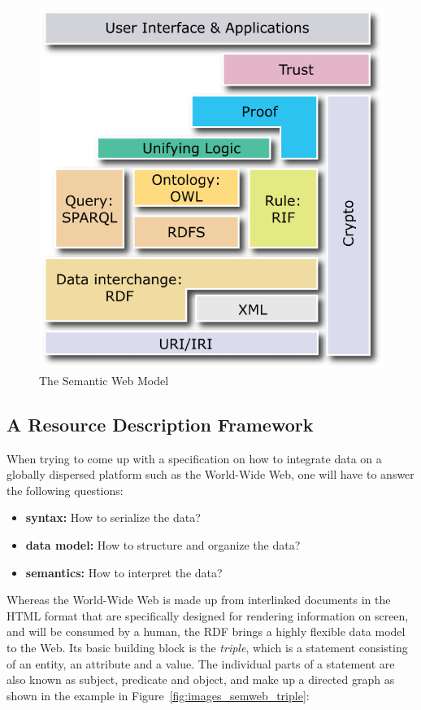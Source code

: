 \begin{figure}[!ht]
	\centering
		\includegraphics[width=0.8\columnwidth]{images/semantic_web_layers.png}
	\caption[The Semantic Web Model]{The Semantic Web Model \citep{W3C2013}}
\label{fig:images_semweb_model}
\end{figure}


\subsection{A Resource Description Framework}
\label{sec:semantic_rdf}

When trying to come up with a specification on how to integrate data on a globally dispersed platform such as the World-Wide Web, one will have to answer the following questions: \@

\begin{itemize}
	\item \textbf{syntax:} How to serialize the data?
	\item \textbf{data model:} How to structure and organize the data?
	\item \textbf{semantics:} How to interpret the data?
\end{itemize}

Whereas the World-Wide Web is made up from interlinked documents in the \gls{HTML} format that are specifically designed for rendering information on screen, and will be consumed by a human, the \gls{RDF} brings a highly flexible data model to the Web. Its basic building block is the \emph{triple}, which is a statement consisting of an entity, an attribute and a value. The individual parts of a statement are also known as subject, predicate and object, and make up a directed graph as shown in the example in Figure~\ref{fig:images_semweb_triple}: \@

